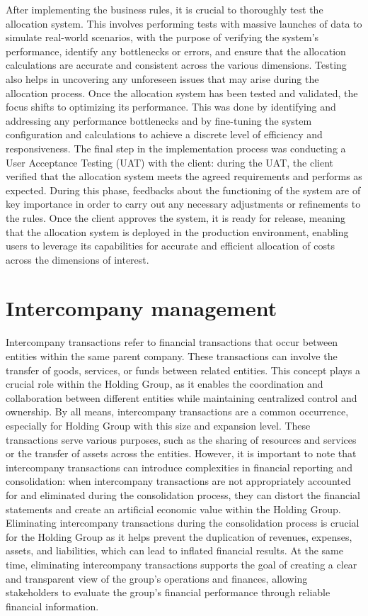 \documentclass[12pt,a4paper,openright,twoside]{book}
\begin{document}
After implementing the business rules, it is crucial to thoroughly test the allocation system.
%
This involves performing tests with massive launches of data to simulate real-world scenarios, with the purpose of verifying the system's performance, identify any bottlenecks or errors, and ensure that the allocation calculations are accurate and consistent across the various dimensions. 
%
Testing also helps in uncovering any unforeseen issues that may arise during the allocation process.
%
Once the allocation system has been tested and validated, the focus shifts to optimizing its performance. 
%
This was done by identifying and addressing any performance bottlenecks and by fine-tuning the system configuration and calculations to achieve a discrete level of efficiency and responsiveness. 
%
The final step in the implementation process was conducting a User Acceptance Testing (UAT) with the client: during the UAT, the client verified that the allocation system meets the agreed requirements and performs as expected. 
%
During this phase, feedbacks about the functioning of the system are of key importance in order to carry out any necessary adjustments or refinements to the rules.
%
Once the client approves the system, it is ready for release, meaning that the allocation system is deployed in the production environment, enabling users to leverage its capabilities for accurate and efficient allocation of costs across the dimensions of interest.

\section{Intercompany management}

Intercompany transactions refer to financial transactions that occur between entities within the same parent company. 
%
These transactions can involve the transfer of goods, services, or funds between related entities.
%
This concept plays a crucial role within the Holding Group, as it enables the coordination and collaboration between different entities while maintaining centralized control and ownership.
%
By all means, intercompany transactions are a common occurrence, especially for Holding Group with this size and expansion level.
%
These transactions serve various purposes, such as the sharing of resources and services or the transfer of assets across the entities. 
%
However, it is important to note that intercompany transactions can introduce complexities in financial reporting and consolidation: when intercompany transactions are not appropriately accounted for and eliminated during the consolidation process, they can distort the financial statements and create an artificial economic value within the Holding Group.
%
Eliminating intercompany transactions during the consolidation process is crucial for the Holding Group as it helps prevent the duplication of revenues, expenses, assets, and liabilities, which can lead to inflated financial results.
%
At the same time, eliminating intercompany transactions supports the goal of creating a clear and transparent view of the group's operations and finances, allowing stakeholders to evaluate the group's financial performance through reliable financial information.
\end{document}
